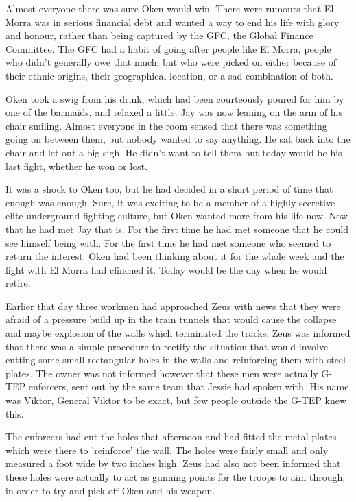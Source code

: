 Almost everyone there was sure Oken would win.  There were rumours that El Morra was in serious financial debt and wanted a way to end his life with glory and honour, rather than being captured by the GFC, the Global Finance Committee.  The GFC had a habit of going after people like El Morra, people who didn't generally owe that much, but who were picked on either because of their ethnic origins, their geographical location, or a sad combination of both.

Oken took a swig from his drink, which had been courteously poured for him by one of the barmaids, and relaxed a little.  Jay was now leaning on the arm of his chair smiling.  Almost everyone in the room sensed that there was something going on between them, but nobody wanted to say anything.  He sat back into the chair and let out a big sigh.  He didn't want to tell them but today would be his last fight, whether he won or lost.

It was a shock to Oken too, but he had decided in a short period of time that enough was enough.  Sure, it was exciting to be a member of a highly secretive elite underground fighting culture, but Oken wanted more from his life now.  Now that he had met Jay that is.  For the first time he had met someone that he could see himself being with.  For the first time he had met someone who seemed to return the interest.  Oken had been thinking about it for the whole week and the fight with El Morra had clinched it.  Today would be the day when he would retire.



\thoughtbreak



Earlier that day three workmen had approached Zeus with news that they were afraid of a pressure build up in the train tunnels that would cause the collapse and maybe explosion of the walls which terminated the tracks.  Zeus was informed that there was a simple procedure to rectify the situation that would involve cutting some small rectangular holes in the walls and reinforcing them with steel plates.  The owner was not informed however that these men were actually G-TEP enforcers, sent out by the same team that Jessie had spoken with.  His name was Viktor, General Viktor to be exact, but few people outside the G-TEP knew this.

The enforcers had cut the holes that afternoon and had fitted the metal plates which were there to 'reinforce' the wall.  The holes were fairly small and only measured a foot wide by two inches high.  Zeus had also not been informed that these holes were actually to act as gunning points for the troops to aim through, in order to try and pick off Oken and his weapon.

